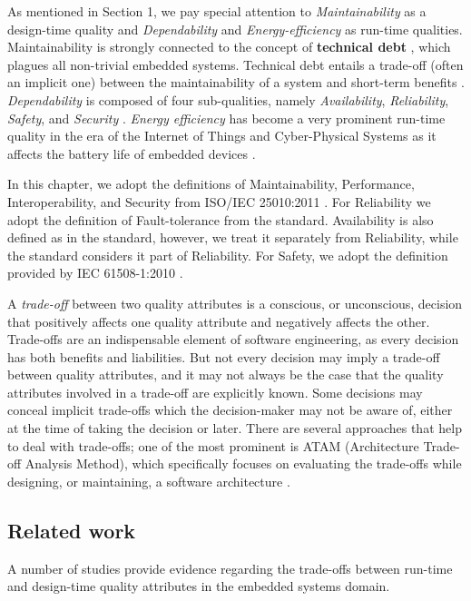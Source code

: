 As mentioned in Section 1, we pay special attention to  \textit{Maintainability} as a design-time quality and \textit{Dependability} and \textit{Energy-efficiency} as run-time qualities. Maintainability is strongly connected to the concept of \textbf{technical debt} \cite{Kruchten2012}, which plagues all non-trivial embedded systems. Technical debt entails a trade-off (often an implicit one) between the maintainability of a system and  short-term benefits \cite{Kruchten2012}. %
\textit{Dependability} is composed of four sub-qualities, namely \textit{Availability}, \textit{Reliability}, \textit{Safety}, and \textit{Security} \cite{JCLaprie1992}. \textit{Energy efficiency} has become a very prominent run-time quality in the era of the Internet of Things and Cyber-Physical Systems as it affects the battery life of embedded devices \cite{Sherman2008}.

In this chapter, we adopt the definitions of Maintainability, Performance, Interoperability, and Security from ISO/IEC 25010:2011 \cite{ISO25010}. For Reliability we adopt the definition of Fault-tolerance from the standard. Availability is also defined as in the standard, however, we treat it separately from Reliability, while the standard considers it part of Reliability.
For Safety, we adopt the definition provided by IEC 61508-1:2010 \cite{IEC61508}. 

A \textit{trade-off} between two quality attributes is a conscious, or unconscious, decision that positively affects one quality attribute and negatively affects the other.
Trade-offs are an indispensable element of software engineering, as every decision has both benefits and liabilities.
But not every decision may imply a trade-off between quality attributes, and it may not always be the case that the quality attributes involved in a trade-off are explicitly known.
Some decisions may conceal implicit trade-offs which the decision-maker may not be aware of, either at the time of taking the decision or later.
There are several approaches that help to deal with trade-offs; one of the most prominent is ATAM (Architecture Trade-off Analysis Method), which specifically focuses on evaluating the trade-offs while designing, or maintaining, a software architecture \cite{Bass2012,Clements2003}.

\subsection{Related work}
A number of studies provide evidence regarding the trade-offs between run-time and design-time quality attributes in the embedded systems domain.

